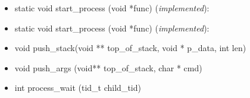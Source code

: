 \documentclass[11pt]{scrartcl}
\begin{document}
\begin{itemize}
	\item static void start\_process (void *func) (\textit{implemented}):\newline
	\item static void start\_process (void *func) (\textit{implemented}):\newline
	\item void push\_stack(void ** top\_of\_stack, void * p\_data, int len)
	\item void	push\_args (void** top\_of\_stack, char * cmd)
	\item int process\_wait (tid\_t child\_tid)
	
\end{itemize}
\end{document}
